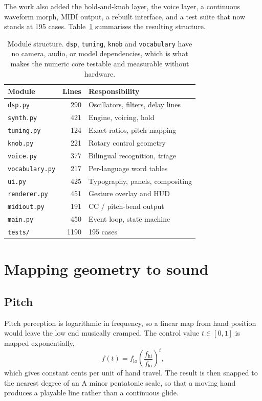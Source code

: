 \documentclass[a4paper,10pt,twocolumn]{article}
\newcommand{\code}[1]{\texttt{\small #1}}
\begin{document}
The work also added the hold-and-knob layer, the voice layer, a continuous
waveform morph, MIDI output, a rebuilt interface, and a test suite that now
stands at 195 cases. Table~\ref{tab:modules} summarises the resulting
structure.

\begin{table}[t]
\centering\small
\begin{tabular}{@{}lrl@{}}
\toprule
Module & Lines & Responsibility \\
\midrule
\code{dsp.py}        & 290 & Oscillators, filters, delay lines \\
\code{synth.py}      & 421 & Engine, voicing, hold \\
\code{tuning.py}     & 124 & Exact ratios, pitch mapping \\
\code{knob.py}       & 221 & Rotary control geometry \\
\code{voice.py}      & 377 & Bilingual recognition, triage \\
\code{vocabulary.py} & 217 & Per-language word tables \\
\code{ui.py}         & 425 & Typography, panels, compositing \\
\code{renderer.py}   & 451 & Gesture overlay and HUD \\
\code{midiout.py}    & 191 & CC / pitch-bend output \\
\code{main.py}       & 450 & Event loop, state machine \\
\midrule
\code{tests/}        & 1190 & 195 cases \\
\bottomrule
\end{tabular}
\caption{Module structure. \code{dsp}, \code{tuning}, \code{knob} and
\code{vocabulary} have no camera, audio, or model dependencies, which is what
makes the numeric core testable and measurable without hardware.}
\label{tab:modules}
\end{table}

\section{Mapping geometry to sound}

\subsection{Pitch}

Pitch perception is logarithmic in frequency, so a linear map from hand
position would leave the low end musically cramped. The control value
$t\in[0,1]$ is mapped exponentially,
\begin{equation}
f(t) = f_{\text{lo}}\left(\frac{f_{\text{hi}}}{f_{\text{lo}}}\right)^{t},
\end{equation}
which gives constant cents per unit of hand travel. The result is then snapped
to the nearest degree of an A minor pentatonic scale, so that a moving hand
produces a playable line rather than a continuous glide.
\end{document}
